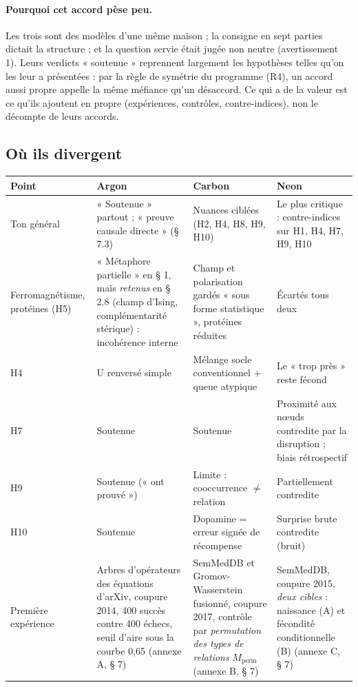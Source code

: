 \documentclass[a4paper,11pt]{article}
\begin{document}
\paragraph{Pourquoi cet accord pèse peu.} Les trois sont des modèles d'une même maison ; la consigne en sept parties dictait la structure ; et la question servie était jugée non neutre (avertissement 1). Leurs verdicts « soutenue » reprennent largement les hypothèses telles qu'on les leur a présentées : par la règle de symétrie du programme (R4), un accord aussi propre appelle la même méfiance qu'un désaccord. Ce qui a de la valeur est ce qu'ils ajoutent en propre (expériences, contrôles, contre-indices), non le décompte de leurs accords.

\subsection{Où ils divergent}
{\small
\begin{longtable}{@{}>{\raggedright\arraybackslash}p{2.6cm}>{\raggedright\arraybackslash}p{4.25cm}>{\raggedright\arraybackslash}p{4.25cm}>{\raggedright\arraybackslash}p{4.25cm}@{}}
\toprule \textbf{Point} & \textbf{Argon} & \textbf{Carbon} & \textbf{Neon}\\ \midrule\endhead
\bottomrule\endfoot
Ton général & « Soutenue » partout ; « preuve causale directe » (§ 7.3) & Nuances ciblées (H2, H4, H8, H9, H10) & Le plus critique : contre-indices sur H1, H4, H7, H9, H10\\ \midrule
Ferromagnétisme, protéines (H5) & « Métaphore partielle » en § 1, mais \emph{retenus} en § 2.8 (champ d'Ising, complémentarité stérique) : incohérence interne & Champ et polarisation gardés « sous forme statistique », protéines réduites & Écartés tous deux\\ \midrule
H4 & U renversé simple & Mélange socle conventionnel $+$ queue atypique & Le « trop près » reste fécond\\ \midrule
H7 & Soutenue & Soutenue & Proximité aux nœuds contredite par la disruption ; biais rétrospectif\\ \midrule
H9 & Soutenue (« ont prouvé ») & Limite : cooccurrence $\neq$ relation & Partiellement contredite\\ \midrule
H10 & Soutenue & Dopamine = erreur signée de récompense & Surprise brute contredite (bruit)\\ \midrule
Première expérience & Arbres d'opérateurs des équations d'arXiv, coupure 2014, 400 succès contre 400 échecs, seuil d'aire sous la courbe 0,65 (annexe A, § 7) & SemMedDB et Gromov-Wasserstein fusionné, coupure 2017, contrôle par \emph{permutation des types de relations} $M_{\text{perm}}$ (annexe B, § 7) & SemMedDB, coupure 2015, \emph{deux cibles} : naissance (A) et fécondité conditionnelle (B) (annexe C, § 7)\\
\end{longtable}}
\end{document}
